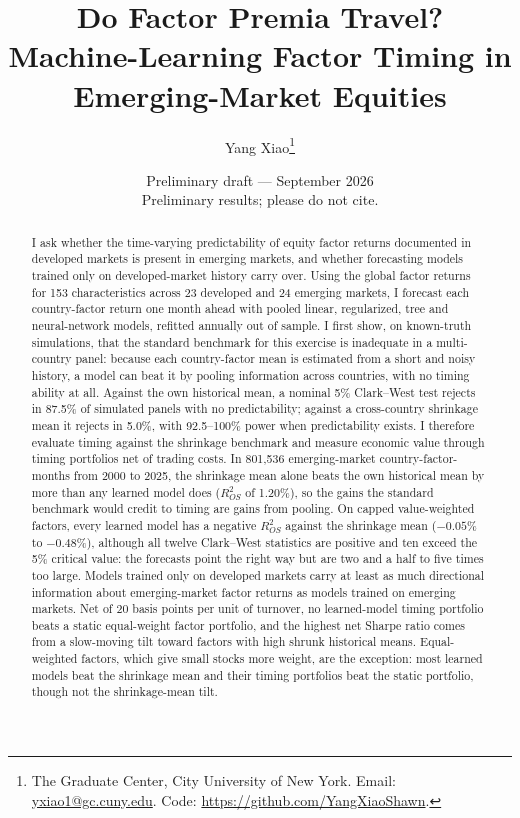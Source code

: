 \documentclass[11pt]{article}
\title{Do Factor Premia Travel?\\[4pt] \large Machine-Learning Factor Timing in Emerging-Market Equities}
\author{Yang Xiao\thanks{The Graduate Center, City University of New York. Email: \href{mailto:yxiao1@gc.cuny.edu}{yxiao1@gc.cuny.edu}. Code: \url{https://github.com/YangXiaoShawn}.}}
\date{Preliminary draft --- September 2026\\ \small Preliminary results; please do not cite.}
\begin{document}
\maketitle

\begin{abstract}
\noindent I ask whether the time-varying predictability of equity factor returns documented in developed markets is present in emerging markets, and whether forecasting models trained only on developed-market history carry over. Using the \citet{jensen2023replication} global factor returns for 153 characteristics across 23 developed and 24 emerging markets, I forecast each country-factor return one month ahead with pooled linear, regularized, tree and neural-network models, refitted annually out of sample. I first show, on known-truth simulations, that the standard benchmark for this exercise is inadequate in a multi-country panel: because each country-factor mean is estimated from a short and noisy history, a model can beat it by pooling information across countries, with no timing ability at all. Against the own historical mean, a nominal 5\% Clark--West test rejects in 87.5\% of simulated panels with no predictability; against a cross-country shrinkage mean it rejects in 5.0\%, with 92.5--100\% power when predictability exists. I therefore evaluate timing against the shrinkage benchmark and measure economic value through timing portfolios net of trading costs. In 801,536 emerging-market country-factor-months from 2000 to 2025, the shrinkage mean alone beats the own historical mean by more than any learned model does ($R^2_{OS}$ of 1.20\%), so the gains the standard benchmark would credit to timing are gains from pooling. On capped value-weighted factors, every learned model has a negative $R^2_{OS}$ against the shrinkage mean ($-0.05$\% to $-0.48$\%), although all twelve Clark--West statistics are positive and ten exceed the 5\% critical value: the forecasts point the right way but are two and a half to five times too large. Models trained only on developed markets carry at least as much directional information about emerging-market factor returns as models trained on emerging markets. Net of 20 basis points per unit of turnover, no learned-model timing portfolio beats a static equal-weight factor portfolio, and the highest net Sharpe ratio comes from a slow-moving tilt toward factors with high shrunk historical means. Equal-weighted factors, which give small stocks more weight, are the exception: most learned models beat the shrinkage mean and their timing portfolios beat the static portfolio, though not the shrinkage-mean tilt.
\end{abstract}
\end{document}
